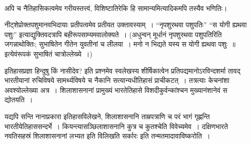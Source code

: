 \vskip 3pt

\begin{myquote}

~\hfill {}
\end{myquote}

\vskip 3pt

अपि च नैतिहासिकत्वमेव गरीयस्तत्त्वं, विशिष्टातिरेकि हि सामान्यमित्यादिकमपि तस्यैव भणितिः।

\vskip 3pt

नीट्शेप्रोक्तपशुमानवभिदायाः प्रतीपत्वमेव प्रतीयत उक्तावस्याम्~। “नृपशुरथवा पशुपतिः” “स योगी ह्यथवा पशुः” इत्याद्युक्तिवदत्रापि बहीरूपसाम्यमवालोक्यते~। (अधुन्वन् मूर्धानं नृपशुरथवा पशुपतिरिति जगन्नाथोक्तिः; सुभाषितेन गीतेन युवतीनां च लीलया~। मनो न भिद्यते यस्य स योगी ह्यथवा पशुः~॥ इत्येवंरूपकं सुभाषितं चात्रोल्लेख्ये~।)

\vskip 3pt

इतिहासप्रज्ञा हिन्दुषु किं नासीदेव? इति प्रश्नमेव स्वलेखस्य शीर्षिकात्वेन प्रतिपद्यमानोऽरविन्दशर्मा  तावद् भारतीयानां रुचिविषये सामर्थ्यविषये च नैकानि सत्यान्यधीतिहासं प्राचीकटत्~। तत्रत्याः केचनांशा अवश्योल्लेख्या अत्र~। शिलाशासनानां प्रामुख्यं भारतेतिहासे विशदीकुर्वन्कांश्चन मुख्यानंशानेवं स द्योतयति~।

\vskip 3pt

यद्यपि सन्ति नानाप्रकारा इतिहासविलेखने, शिलाशासनानि ताम्रपत्राणि च परं भागं गृह्णन्ति भारतीयेतिहाससन्दर्भे~। कियन्त्यासञ्छिलाशासनानि कुत्र च कुतश्चेति विवेच्यमेव~। दक्षिणभारते नवतिसहस्रं शिलाशासनानां लभ्यत इति विलिखति सर्कारः  इति तन्मतमादावाविष्करोति~।

\vskip 3pt

\begin{myquote}

~\hfill {}
\end{myquote}

